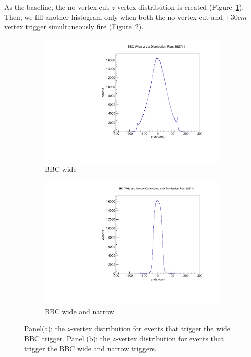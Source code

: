As the baseline, the no vertex cut $z$-vertex distribution is created
(Figure~\ref{fig:bbc_novtx_cut}). Then, we fill another histogram only when both
the no-vertex cut and $\pm30cm$ vertex trigger simultaneously fire
(Figure~\ref{fig:bbc_simultaneous}). 

\begin{figure}
  \centering
  \begin{subfigure}[b]{0.7\linewidth}
    \includegraphics[width=\textwidth]{./figures/bbc_wide_zvtx.pdf}
    \caption{BBC wide}
    \label{fig:bbc_novtx_cut}
  \end{subfigure}
  \begin{subfigure}[b]{0.7\linewidth}
    \includegraphics[width=\textwidth]{./figures/bbc_wide_and_narrow_zvtx.pdf}
    \caption{BBC wide and narrow}
    \label{fig:bbc_simultaneous}
  \end{subfigure}
  \caption{
    Panel(a): the $z$-vertex distribution for events that trigger the wide BBC
    trigger. Panel (b): the $z$-vertex distribution for events that trigger the
    BBC wide and narrow triggers.
  }
  \label{fig:bbc_acc_figures}
\end{figure}

